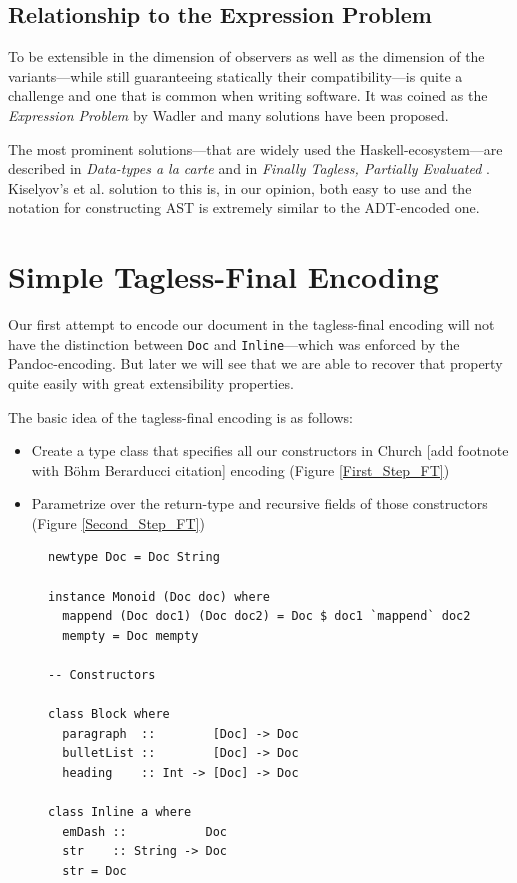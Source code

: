 \subsection{Relationship to the Expression Problem}

To be extensible in the dimension of observers as well as the dimension of the
variants—while still guaranteeing statically their compatibility—is quite a
challenge and one that is common when writing software. It was coined as the
\emph{Expression Problem} by Wadler \cite{expression-problem} and many solutions
have been proposed.

The most prominent solutions—that are widely used the Haskell-ecosystem—are
described in \emph{Data-types a la carte} \cite{data-types-a-la-carte} and in
\emph{Finally Tagless, Partially Evaluated} \cite{finally-tagless}. Kiselyov’s
et al. solution to this is, in our opinion, both easy to use and the notation
for constructing AST is extremely similar to the ADT-encoded one.


\section{Simple Tagless-Final Encoding}

Our first attempt to encode our document in the tagless-final encoding will not
have the distinction between \texttt{Doc} and \texttt{Inline}—which was enforced
by the Pandoc-encoding. But later we will see that we are able to recover that
property quite easily with great extensibility properties.

The basic idea of the tagless-final encoding is as follows:

\begin{itemize}
\item Create a type class that specifies all our constructors in Church [add
  footnote with Böhm Berarducci citation] encoding (Figure \ref{First_Step_FT})
\item Parametrize over the return-type and recursive fields of those
  constructors (Figure \ref{Second_Step_FT})
\end{itemize}

\begin{figure}
\begin{lstlisting}
newtype Doc = Doc String

instance Monoid (Doc doc) where
  mappend (Doc doc1) (Doc doc2) = Doc $ doc1 `mappend` doc2
  mempty = Doc mempty

-- Constructors

class Block where
  paragraph  ::        [Doc] -> Doc
  bulletList ::        [Doc] -> Doc
  heading    :: Int -> [Doc] -> Doc

class Inline a where
  emDash ::           Doc
  str    :: String -> Doc
  str = Doc
\end{lstlisting}
\end{figure}

